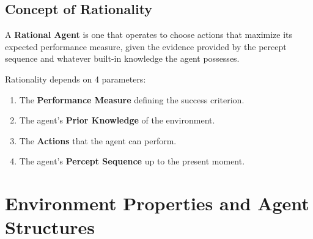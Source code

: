 \documentclass[12pt,a4paper]{article}
\begin{document}
\subsection{Concept of Rationality}
A \textbf{Rational Agent} is one that operates to choose actions that maximize its expected performance measure, given the evidence provided by the percept sequence and whatever built-in knowledge the agent possesses.

\begin{tcolorbox}[examplebox, title={Factors Determining Rationality}]
  Rationality depends on 4 parameters:
  \begin{enumerate}[leftmargin=*, noitemsep]
    \item The \textbf{Performance Measure} defining the success criterion.
    \item The agent's \textbf{Prior Knowledge} of the environment.
    \item The \textbf{Actions} that the agent can perform.
    \item The agent's \textbf{Percept Sequence} up to the present moment.
  \end{enumerate}
\end{tcolorbox}

\section{Environment Properties and Agent Structures}
\end{document}
